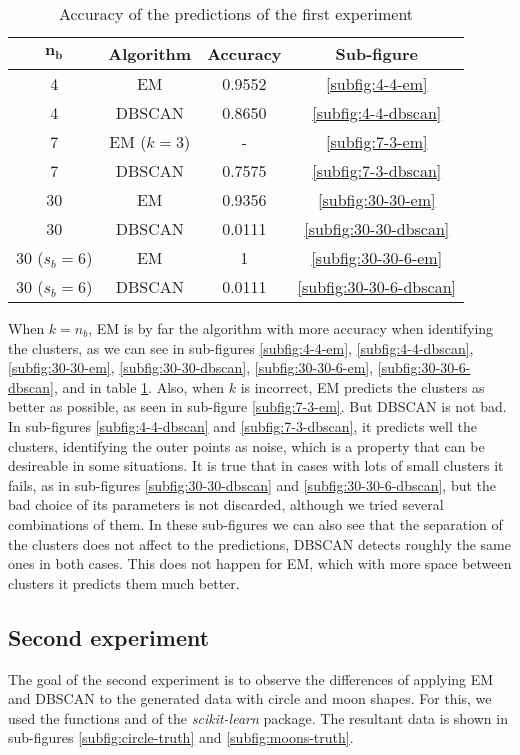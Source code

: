 \begin{table}[hbtp]
    \centering
    \begin{tabular}{c c c c}
        \toprule
        $\bm{n_b}$ & \textbf{Algorithm} &  \textbf{Accuracy} & \textbf{Sub-figure} \\ \midrule
        4 & EM & 0.9552 & \ref{subfig:4-4-em} \\
        4 & DBSCAN & 0.8650 & \ref{subfig:4-4-dbscan} \\
        7 & EM ($k = 3$) & - & \ref{subfig:7-3-em} \\
        7 & DBSCAN & 0.7575 & \ref{subfig:7-3-dbscan} \\
        30 & EM & 0.9356 & \ref{subfig:30-30-em} \\
        30 & DBSCAN & 0.0111 & \ref{subfig:30-30-dbscan} \\
        30 ($s_b = 6$) & EM & 1 & \ref{subfig:30-30-6-em} \\
        30 ($s_b = 6$) & DBSCAN & 0.0111 & \ref{subfig:30-30-6-dbscan} \\
        \bottomrule
    \end{tabular}
    \caption{Accuracy of the predictions of the first experiment}
    \label{tab:accuracy}
\end{table}

When $k = n_b$, EM is by far the algorithm with more accuracy when identifying the clusters, as we can see in sub-figures \ref{subfig:4-4-em}, \ref{subfig:4-4-dbscan}, \ref{subfig:30-30-em}, \ref{subfig:30-30-dbscan}, \ref{subfig:30-30-6-em}, \ref{subfig:30-30-6-dbscan}, and in table \ref{tab:accuracy}. Also, when $k$ is incorrect, EM predicts the clusters as better as possible, as seen in sub-figure \ref{subfig:7-3-em}. But DBSCAN is not bad. In sub-figures \ref{subfig:4-4-dbscan} and \ref{subfig:7-3-dbscan}, it predicts well the clusters, identifying the outer points as noise, which is a property that can be desireable in some situations. It is true that in cases with lots of small clusters it fails, as in sub-figures \ref{subfig:30-30-dbscan} and \ref{subfig:30-30-6-dbscan}, but the bad choice of its parameters is not discarded, although we tried several combinations of them. In these sub-figures we can also see that the separation of the clusters does not affect to the predictions, DBSCAN detects roughly the same ones in both cases. This does not happen for EM, which with more space between clusters it predicts them much better.

\subsection{Second experiment}
The goal of the second experiment is to observe the differences of applying EM and DBSCAN to the generated data with circle and moon shapes. For this, we used the functions  and  of the \textit{scikit-learn} package. The resultant data is shown in sub-figures \ref{subfig:circle-truth} and \ref{subfig:moons-truth}.

